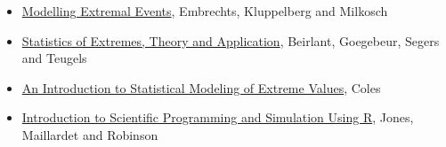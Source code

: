 \cleardoublepage
{}


\begin{itemize}
	\item \underline{Modelling Extremal Events}, Embrechts, Kluppelberg and Milkosch
	\item \underline{Statistics of Extremes, Theory and Application}, Beirlant, Goegebeur, Segers and Teugels
	\item \underline{An Introduction to Statistical Modeling of Extreme Values}, Coles
	\item \underline{Introduction to Scientific Programming and Simulation Using R}, Jones, Maillardet and Robinson
\end{itemize}

